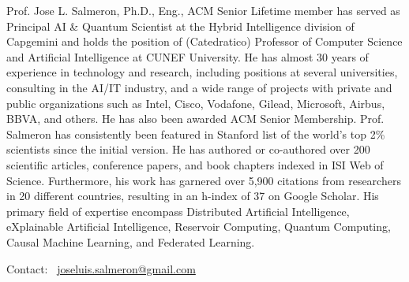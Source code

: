 {\small 
Prof. Jose L. Salmeron, Ph.D., Eng., ACM Senior Lifetime member has served as Principal AI \& Quantum Scientist at the Hybrid Intelligence division of Capgemini and holds the position of (Catedratico) Professor of Computer Science and Artificial Intelligence at CUNEF University. He has almost 30 years of experience in technology and research, including positions at several universities, consulting in the AI/IT industry, and a wide range of projects with private and public organizations such as Intel, Cisco, Vodafone, Gilead, Microsoft, Airbus, BBVA, and others. He has also been awarded ACM Senior Membership. Prof. Salmeron has consistently been featured in Stanford list of the world’s top 2\% scientists since the initial version. He has authored or co-authored over 200 scientific articles, conference papers, and book chapters indexed in ISI Web of Science. Furthermore, his work has garnered over 5,900 citations from researchers in 20 different countries, resulting in an h-index of 37 on Google Scholar. His primary field of expertise encompass Distributed Artificial Intelligence, eXplainable Artificial Intelligence, Reservoir Computing, Quantum Computing, Causal Machine Learning, and Federated Learning.}

Contact: \faEnvelope\ \href{mailto:joseluis.salmeron@gmail.com}{joseluis.salmeron@gmail.com}